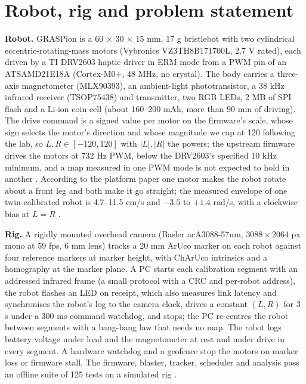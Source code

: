 \section{Robot, rig and problem
statement}\label{sec:robot-rig-problem}

\textbf{Robot.} GRASPion \cite{novkoski2026graspion} is a 60 × 30 × 15
mm, 17 g bristlebot with two cylindrical eccentric-rotating-mass motors
(Vybronics VZ3TH8B171700L, 2.7 V rated), each driven by a TI DRV2603
haptic driver in ERM mode from a PWM pin of an ATSAMD21E18A (Cortex-M0+,
48 MHz, no crystal). The body carries a three-axis magnetometer
(MLX90393), an ambient-light phototransistor, a 38 kHz infrared receiver
(TSOP75438) and transmitter, two RGB LEDs, 2 MB of SPI flash and a
Li-ion coin cell (about 160--200 mAh, more than 90 min of driving). The
drive command is a signed value per motor on the firmware's scale, whose
sign selects the motor's direction and whose magnitude we cap at 120
following the lab, so \(L, R \in [-120, 120]\) with \(|L|, |R|\) the
powers; the
upstream firmware drives the motors at 732 Hz PWM, below the DRV2603's
specified 10 kHz minimum, and a map measured in one PWM mode is not
expected to hold in another .
According to the platform paper one motor makes the robot rotate about a
front leg and both make it go straight; the measured envelope of one
twin-calibrated robot is 4.7--11.5 cm/s and \(-3.5\) to \(+1.4\) rad/s,
with a clockwise bias at \(L=R\) \cite{mammadli2026twin}.

\textbf{Rig.} A rigidly mounted overhead camera (Basler acA3088-57um,
\(3088\times2064\) px mono at 59 fps, 6 mm lens) tracks a 20 mm ArUco marker
\cite{garrido2014aruco} on each robot against four reference markers at
marker height, with ChArUco intrinsics and a homography at the marker
plane. A PC starts each calibration segment with an addressed infrared
frame (a small protocol with a CRC and per-robot address), the robot
flashes an LED on receipt, which also measures link latency and
synchronises the robot's log to the camera clock, drives a constant
\((L,R)\) for 3 s under a 300 ms command watchdog, and stops; the PC
re-centres the robot between segments with a bang-bang law that needs no
map. The robot logs battery voltage under load and the magnetometer at
rest and under drive in every segment. A hardware watchdog and a
geofence stop the motors on marker loss or firmware stall. The firmware,
blaster, tracker, scheduler and analysis pass an offline suite of 125
tests on a simulated rig .

